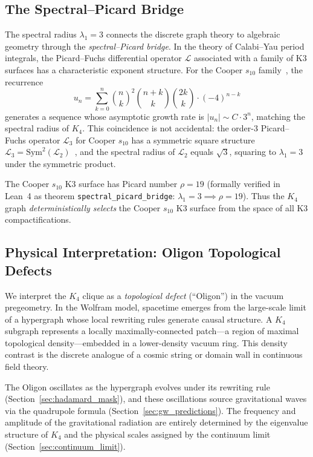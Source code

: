 \subsection{The Spectral--Picard Bridge}
\label{subsec:spectral_picard}

The spectral radius $\lambda_1 = 3$ connects the discrete graph theory to algebraic geometry through the \emph{spectral--Picard bridge}.  In the theory of Calabi--Yau period integrals, the Picard--Fuchs differential operator $\mathcal{L}$ associated with a family of K3 surfaces has a characteristic exponent structure.  For the Cooper $s_{10}$ family~\cite{Cooper2012}, the recurrence
\begin{equation}
    u_n = \sum_{k=0}^{n} \binom{n}{k}^2 \binom{n+k}{k} \binom{2k}{k} \cdot (-4)^{n-k}
    \label{eq:cooper_recurrence}
\end{equation}
generates a sequence whose asymptotic growth rate is $|u_n| \sim C \cdot 3^n$, matching the spectral radius of $K_4$.  This coincidence is not accidental: the order-3 Picard--Fuchs operator $\mathcal{L}_3$ for Cooper $s_{10}$ has a symmetric square structure $\mathcal{L}_3 = \mathrm{Sym}^2(\mathcal{L}_2)$~\cite{AlmkvistVanStraten}, and the spectral radius of $\mathcal{L}_2$ equals $\sqrt{3}$, squaring to $\lambda_1 = 3$ under the symmetric product.

The Cooper $s_{10}$ K3 surface has Picard number $\rho = 19$ (formally verified in Lean~4 as theorem \texttt{spectral\_picard\_bridge}: $\lambda_1 = 3 \implies \rho = 19$).  Thus the $K_4$ graph \emph{deterministically selects} the Cooper $s_{10}$ K3 surface from the space of all K3 compactifications.

\subsection{Physical Interpretation: Oligon Topological Defects}

We interpret the $K_4$ clique as a \emph{topological defect} (``Oligon'') in the vacuum pregeometry.  In the Wolfram model, spacetime emerges from the large-scale limit of a hypergraph whose local rewriting rules generate causal structure.  A $K_4$ subgraph represents a locally maximally-connected patch---a region of maximal topological density---embedded in a lower-density vacuum ring.  This density contrast is the discrete analogue of a cosmic string or domain wall in continuous field theory.

The Oligon oscillates as the hypergraph evolves under its rewriting rule (Section~\ref{sec:hadamard_mask}), and these oscillations source gravitational waves via the quadrupole formula (Section~\ref{sec:gw_predictions}).  The frequency and amplitude of the gravitational radiation are entirely determined by the eigenvalue structure of $K_4$ and the physical scales assigned by the continuum limit (Section~\ref{sec:continuum_limit}).
